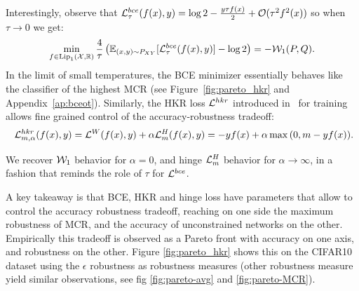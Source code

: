     Interestingly, observe that $\mathcal{L}^{bce}_{\tau}(f(x),y)=\log{2}-\frac{y\tau f(x)}{2}+\mathcal{O}(\tau^2 f^2(x))$ so when $\tau\rightarrow 0$ we get:
        $$\min_{f\in\text{Lip}_1(\mathcal{X},\mathbb{R})}\frac{4}{\tau}\left(\mathbb{E}_{(x,y)\sim P_{XY}}[\mathcal{L}^{bce}_{\tau}(f(x),y)]-\log{2}\right)=-\mathcal{W}_1(P,Q).$$
    In the limit of small temperatures, the BCE minimizer essentially behaves like the classifier of the highest MCR (see Figure~\ref{fig:pareto_hkr} and Appendix~\ref{ap:bceot}). Similarly, the HKR loss $\mathcal{L}^{hkr}$ introduced in~\cite{serrurier2020achieving} for \LipCl training allows fine grained control of the accuracy-robustness tradeoff: %
    \begin{equation}~\label{eq:hkrdef}
        \mathcal{L}^{hkr}_{m,\alpha}(f(x),y)=\mathcal{L}^W(f(x),y)+\alpha\mathcal{L}^H_{m}(f(x),y)=-yf(x)+\alpha\max{(0, m - yf(x))}.
    \end{equation}
    
    We recover $\mathcal{W}_1$ behavior for $\alpha=0$, and hinge $\mathcal{L}^H_{m}$ behavior for $\alpha\rightarrow\infty$, in a fashion that reminds the role of $\tau$ for $\mathcal{L}^{bce}$.
    
    A key takeaway is that BCE, HKR and hinge loss have parameters that allow to control the accuracy robustness tradeoff, reaching on one side the maximum robustness of MCR, and the accuracy of unconstrained networks on the other. Empirically this tradeoff is observed as a Pareto front with accuracy on one axis, and robustness on the other. Figure \ref{fig:pareto_hkr} shows this on the CIFAR10 dataset using the $\epsilon$ robustness as robustness measures (other robustness measure yield similar observations, see fig \ref{fig:pareto-avg} and \ref{fig:pareto-MCR}).
    
